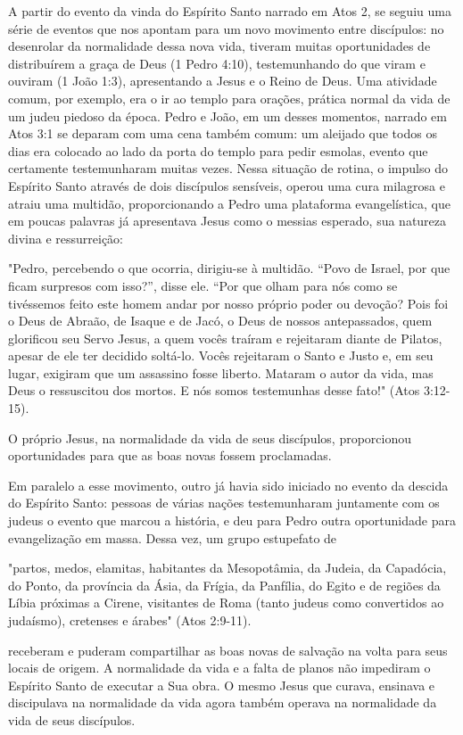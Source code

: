 \documentclass[12pt]{abntex2}
\begin{document}
A partir do evento da vinda do Espírito Santo narrado em Atos 2, se seguiu uma série de eventos que nos apontam para um novo movimento entre discípulos: no desenrolar da normalidade dessa nova vida, tiveram muitas oportunidades de distribuírem a graça de Deus (1 Pedro 4:10), testemunhando do que viram e ouviram (1 João 1:3), apresentando a Jesus e o Reino de Deus. Uma atividade comum, por exemplo, era o ir ao templo para orações, prática normal da vida de um judeu piedoso da época. Pedro e João, em um desses momentos, narrado em Atos 3:1 se deparam com uma cena também comum: um aleijado que todos os dias era colocado ao lado da porta do templo para pedir esmolas, evento que certamente testemunharam muitas vezes. Nessa situação de rotina, o impulso do Espírito Santo através de dois discípulos sensíveis, operou uma cura milagrosa e atraiu uma multidão, proporcionando a Pedro uma plataforma evangelística, que em poucas palavras já apresentava Jesus como o messias esperado, sua natureza divina e ressurreição:

\begin{citacao}
	"Pedro, percebendo o que ocorria, dirigiu-se à multidão. “Povo de Israel, por que ficam surpresos com isso?”, disse ele. “Por que olham para nós como se tivéssemos feito este homem andar por nosso próprio poder ou devoção? Pois foi o Deus de Abraão, de Isaque e de Jacó, o Deus de nossos antepassados, quem glorificou seu Servo Jesus, a quem vocês traíram e rejeitaram diante de Pilatos,	apesar de ele ter decidido soltá-lo. Vocês rejeitaram o Santo e Justo e, em seu lugar, exigiram que um assassino fosse liberto. Mataram o autor da vida, mas Deus o ressuscitou dos mortos. E nós somos testemunhas desse fato!" (Atos 3:12-15).
\end{citacao}

O próprio Jesus, na normalidade da vida de seus discípulos, proporcionou oportunidades para que as boas novas fossem proclamadas.

Em paralelo a esse movimento, outro já havia sido iniciado no evento da descida do Espírito Santo: pessoas de várias nações testemunharam juntamente com os judeus o evento que marcou a história, e deu para Pedro outra oportunidade para evangelização em massa. Dessa vez, um grupo estupefato de 
\begin{citacao}"partos, medos, elamitas, habitantes da Mesopotâmia, da Judeia, da Capadócia, do Ponto, da província da Ásia, da Frígia, da Panfília, do Egito e de regiões da Líbia próximas a Cirene, visitantes de Roma (tanto judeus como convertidos ao judaísmo), cretenses e árabes" (Atos 2:9-11).\end{citacao} receberam e puderam compartilhar as boas novas de salvação na volta para seus locais de origem. A normalidade da vida e a falta de planos não impediram o Espírito Santo de executar a Sua obra. O mesmo Jesus que curava, ensinava e discipulava na normalidade da vida agora também operava na normalidade da vida de seus discípulos.
\end{document}

